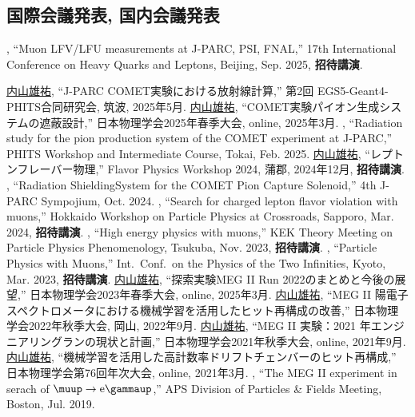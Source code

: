 \subsection{国際会議発表, 国内会議発表}
\begin{enumerate}
\setcounter{enumi}{38}
	\setlength{\itemsep}{-1pt}
	
 	 \me, ``Muon LFV/LFU measurements at J-PARC, PSI, FNAL,''
  	17th International Conference on Heavy Quarks and Leptons, Beijing, Sep. 2025, \textbf{招待講演}.

  	\underline{内山雄祐},  	``J-PARC COMET実験における放射線計算,''
  	第2回 EGS5-Geant4-PHITS合同研究会, 筑波,  2025年5月.
  	\underline{内山雄祐},  	``COMET実験パイオン生成システムの遮蔽設計,''
  	日本物理学会2025年春季大会, online,  2025年3月.
  	\me, ``Radiation study for the pion production system of the COMET experiment at J-PARC,''
 	 PHITS Workshop and Intermediate Course, Tokai, Feb. 2025.
  	\underline{内山雄祐},  	``レプトンフレーバー物理,''
  	Flavor Physics Workshop 2024, 蒲郡,  2024年12月, \textbf{招待講演}.
  	\me, ``Radiation ShieldingSystem for the COMET Pion Capture Solenoid,''
  	4th J-PARC Sympojium, Oct. 2024.
 	 \me, ``Search for charged lepton flavor violation with muons,''
  	Hokkaido Workshop on Particle Physics at Crossroads, Sapporo, Mar. 2024, \textbf{招待講演}.
 	 \me, ``High energy physics with muons,''
  	KEK Theory Meeting on Particle Physics Phenomenology, Tsukuba, Nov. 2023, \textbf{招待講演}.
 	 \me, ``Particle Physics with Muons,''
  	Int.\ Conf.\ on the Physics of the Two Infinities, Kyoto, Mar. 2023, \textbf{招待講演}.
  	\underline{内山雄祐},  	``\megc 探索実験MEG II Run 2022のまとめと今後の展望,''
  	日本物理学会2023年春季大会, online,  2025年3月.
  	\underline{内山雄祐},  	``MEG II 陽電子スペクトロメータにおける機械学習を活用したヒット再構成の改善,''
  	日本物理学会2022年秋季大会,  岡山,  2022年9月.
  	\underline{内山雄祐},  	``MEG II 実験：2021 年エンジニアリングランの現状と計画,''
  	日本物理学会2021年秋季大会,  online,  2021年9月.
  	\underline{内山雄祐},  	``機械学習を活用した高計数率ドリフトチェンバーのヒット再構成,''
  	日本物理学会第76回年次大会,  online,  2021年3月.
 	 \me, ``The MEG II experiment in serach of $\meg$,''
  	APS Division of Particles \& Fields Meeting, Boston, Jul. 2019.
  	

\end{enumerate}
